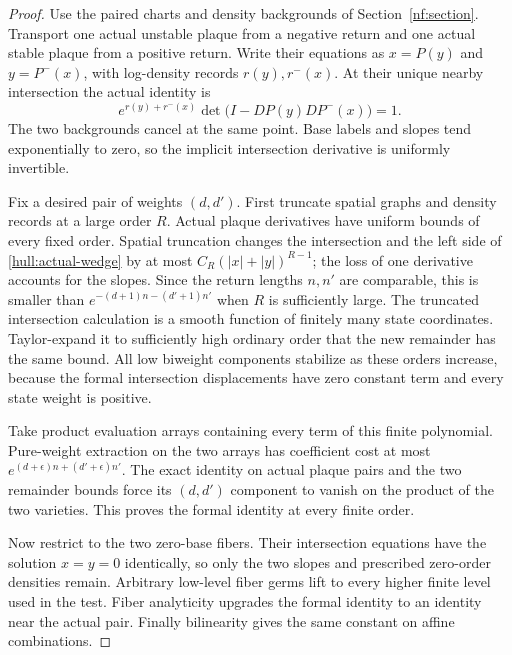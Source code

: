\begin{proof}
Use the paired charts and density backgrounds of
Section~\ref{nf:section}. Transport one actual unstable plaque from a
negative return and one actual stable plaque from a positive return.
Write their equations as $x=P(y)$ and $y=P^-(x)$, with log-density
records $r(y),r^-(x)$. At their unique nearby intersection the actual
identity is
\begin{equation}\label{hull:actual-wedge}
 e^{r(y)+r^-(x)}\det\bigl(I-DP(y)DP^-(x)\bigr)=1.
\end{equation}
The two backgrounds cancel at the same point. Base labels and slopes
tend exponentially to zero, so the implicit intersection derivative
is uniformly invertible.

Fix a desired pair of weights $(d,d')$. First truncate spatial graphs
and density records at a large order $R$. Actual plaque derivatives
have uniform bounds of every fixed order. Spatial truncation changes
the intersection and the left side of
\eqref{hull:actual-wedge} by at most
$C_R(|x|+|y|)^{R-1}$; the loss of one derivative accounts for the slopes.
Since the return lengths $n,n'$ are comparable, this is smaller than
$e^{-(d+1)n-(d'+1)n'}$ when $R$ is sufficiently large. The truncated
intersection calculation is a smooth function of finitely many state
coordinates. Taylor-expand it to sufficiently high ordinary order that
the new remainder has the same bound. All low biweight components
stabilize as these orders increase, because the formal intersection
displacements have zero constant term and every state weight is positive.

Take product evaluation arrays containing every term of this finite
polynomial. Pure-weight extraction on the two arrays has coefficient
cost at most $e^{(d+\epsilon)n+(d'+\epsilon)n'}$. The exact identity
on actual plaque pairs and the two remainder bounds force its
$(d,d')$ component to vanish on the product of the two varieties.
This proves the formal identity at every finite order.

Now restrict to the two zero-base fibers. Their intersection equations
have the solution $x=y=0$ identically, so only the two slopes and
prescribed zero-order densities remain. Arbitrary low-level fiber germs
lift to every higher finite level used in the test. Fiber analyticity
upgrades the formal identity to an identity near the actual pair.
Finally bilinearity gives the same constant on affine combinations.
\end{proof}

